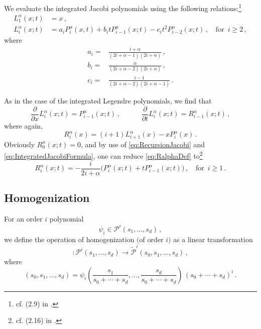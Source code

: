 We evaluate the integrated Jacobi polynomials using the following relations:\footnote{cf. (2.9) in \citet{Beuchler_Pillwein_07}.}
\begin{equation}
	\begin{aligned}
		L^{\alpha}_1(x;t) & = x\,, \\
		L^{\alpha}_i(x;t) & = a_i P^{\alpha}_i(x,t) + b_i t P^{\alpha}_{i-1}(x;t)- c_i t^2 P^{\alpha}_{i-2}(x;t)\,,
			\quad\text{for }\, i\geq2\,,
	\end{aligned}
	\label{eq:IntegratedJacobiFormula}
\end{equation}
where
\begin{equation*}
	\begin{aligned}
		a_i = & \frac{i + \alpha}{(2i + \alpha -1)(2i + \alpha)}\,, \\
		b_i = & \frac{\alpha}{(2i + \alpha -2)(2i + \alpha)}\,, \\
		c_i = & \frac{i-1}{(2i + \alpha -2)(2i + \alpha-1)}\,.
	\end{aligned}
\end{equation*}

As in the case of the integrated Legendre polynomials, we find that
\begin{equation}
\frac{\partial }{\partial x}L^\alpha_{i}(x;t) = P^\alpha_{i-1}(x;t)\,,\qquad\quad\frac{\partial}{\partial t} L^\alpha_{i}(x;t) = R^\alpha_{i-1}(x;t)\,,
\end{equation}
where again,
\begin{equation}
	R^\alpha_i(x) = (i+1)L^\alpha_{i+1}(x) - xP^\alpha_i(x)\,.
\label{eq:RalphaDef}
\end{equation}
Obviously $R^\alpha_0(x;t)=0$, and by use of \eqref{eq:RecursionJacobi} and \eqref{eq:IntegratedJacobiFormula}, one can reduce \eqref{eq:RalphaDef} to\footnote{cf. (2.16) in \citet{Beuchler_Pillwein_07}.}
\begin{equation}
	R^\alpha_i(x;t) = -\frac{i}{2i+\alpha} \Big(P^\alpha_i(x;t)+tP^\alpha_{i-1}(x;t)\Big)\,,\quad\text{for }\,i\geq1\,.
\end{equation}


\subsection{Homogenization}

\begin{definition*}
For an order $i$ polynomial
\begin{equation*}
	\psi_i \in \mathcal{P}^i(s_1,\ldots,s_d)\,,
\end{equation*}
we define the operation of homogenization $($of order $i$$)$ as a linear transformation
\begin{equation}
 [\,\cdot\,]:\mathcal{P}^i(s_1,\ldots,s_d) \longrightarrow \tilde{\mathcal{P}}^i(s_0,s_1,\ldots,s_d)\,,
\end{equation}
where
\begin{equation*}
	[\psi_i](s_0,s_1,\ldots,s_d)=\psi_i\left(\frac{s_1}{s_0+\cdots+s_d},\ldots,\frac{s_d}{s_0+\cdots+s_d}\right)\,(s_0+\cdots+s_d)^i\,.
\end{equation*}
\end{definition*}

